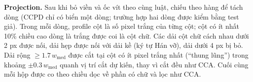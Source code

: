 \textbf{Projection.} Sau khi bỏ viền và ốc vít theo cùng luật,  chiếu theo hàng để tách dòng (CCPD chỉ có biển một dòng; trường hợp hai dòng được kiểm bằng test giả). Trong mỗi dòng, profile cột là số pixel trắng của từng cột; cột có ít nhất 10\% chiều cao dòng là trắng được coi là cột chữ. Các dải cột chữ cách nhau dưới 2 px được nối, dải hẹp được nối với dải kề (ký tự Hán vỡ), dải dưới 4 px bị bỏ. Dải rộng $\ge 1.7\,w_{\mathrm{med}}$ được cắt tại cột có ít pixel trắng nhất (``thung lũng'') trong khoảng $\pm 0.3\,w_{\mathrm{med}}$ quanh vị trí cắt dự kiến, thay vì cắt đều như CCA. Cuối cùng mỗi hộp được co theo chiều dọc về phần có chữ và lọc như CCA.
